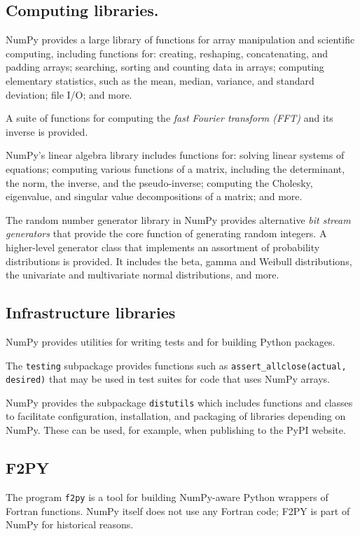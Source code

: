 \subsection*{Computing libraries.}

NumPy provides a large library of functions for array manipulation
and scientific computing, including functions for: creating, reshaping,
concatenating, and padding arrays; searching, sorting and counting data
in arrays; computing elementary statistics, such as the mean, median,
variance, and standard deviation; file I/O; and more.

A suite of functions for computing the \emph{fast Fourier transform (FFT)}
and its inverse is provided.

NumPy's linear algebra library includes functions for: solving linear
systems of equations; computing various functions of a matrix, including
the determinant, the norm, the inverse, and the pseudo-inverse;
computing the Cholesky, eigenvalue, and singular value decompositions of a matrix;
and more.

The random number generator library in NumPy provides alternative
\emph{bit stream generators} that provide the core function of generating
random integers.
A higher-level generator class that implements an assortment of
probability distributions is provided. It includes the beta, gamma
and Weibull distributions, the univariate and multivariate normal
distributions, and more.

\subsection*{Infrastructure libraries}

NumPy provides utilities for writing tests and for building Python packages.

The \texttt{testing} subpackage provides functions such as
\texttt{assert\_allclose(actual, desired)} that may be used in
test suites for code that uses NumPy arrays.

NumPy provides the subpackage \texttt{distutils} which includes functions and classes
to facilitate configuration, installation, and packaging of libraries depending on NumPy.
These can be used, for example, when publishing to the PyPI website.

\subsection*{F2PY}  The program \texttt{f2py} is a tool for
building NumPy-aware Python wrappers of Fortran functions.
NumPy itself does not use any Fortran code;  F2PY is part of NumPy
for historical reasons.


